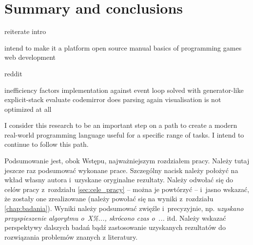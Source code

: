 \chapter{Summary and conclusions}\label{chap:summary}
reiterate intro

intend to make it a platform
open source
manual
basics of programming
games
web development

reddit

inefficiency factors
    implementation against event loop
        solved with generator-like explicit-stack evaluate
    codemirror does parsing again
    visualisation is not optimized at all
    
I consider this research to be an important step on a path to create a modern real-world programming language useful for a specific range of tasks. I intend to continue to follow this path.
    
Podsumowanie jest, obok Wstępu, najważniejszym rozdziałem pracy. Należy tutaj
jeszcze raz podsumować wykonane prace. Szczególny nacisk należy położyć na wkład
własny autora i~uzyskane oryginalne rezultaty. Należy odwołać się do celów pracy
z~rozdziału \ref{sec:cele_pracy} -- można je powtórzyć -- i~jasno wskazać, że
zostały one zrealizowane (należy powołać się na wyniki z~rozdziału
\ref{chap:badania}). Wyniki należy podsumować zwięźle i~precyzyjnie, np.
\textit{uzyskano przyspieszenie algorytmu o~X\%..., skrócono czas o~...}  itd.
Należy wskazać perspektywy dalszych badań bądź zastosowanie uzyskanych
rezultatów do rozwiązania problemów znanych z literatury.


